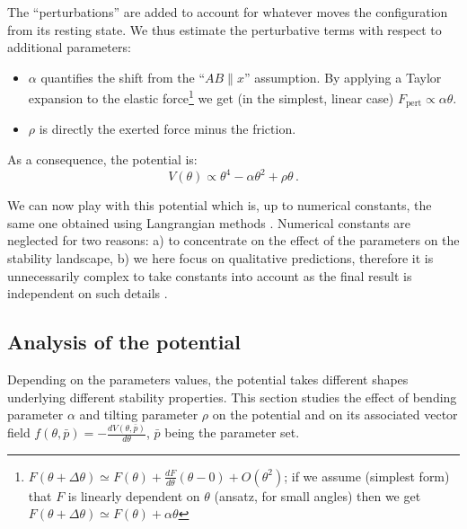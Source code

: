 The ``perturbations'' are added to account for whatever moves the configuration from its resting state. We thus estimate the perturbative terms with respect to additional parameters:
\begin{itemize}
	\item $\alpha$ quantifies the shift from the ``$AB \parallel x$'' assumption. By applying a Taylor expansion to the elastic force\footnote{$F(\theta + \Delta \theta) \simeq F(\theta) + \frac{dF}{d \theta}(\theta - 0) + O(\theta^2)$; if we assume (simplest form) that $F$ is linearly dependent on $\theta$ (ansatz, for small angles) then we get $F(\theta + \Delta \theta) \simeq F(\theta) + \alpha \theta $} we get (in the simplest, linear case) $F_{\text{pert}} \propto \alpha \theta$. 
	\item $\rho$ is directly the exerted force minus the friction.
\end{itemize}

As a consequence, the potential is:
\begin{equation}
	V(\theta) \propto \theta^4 - \alpha \theta^2 + \rho \theta \, .
	\label{eq:cm_potential}
\end{equation}

We can now play with this potential which is, up to numerical constants, the same one obtained using Langrangian methods \citep{poston1979catastrophe}. Numerical constants are neglected for two reasons: a) to concentrate on the effect of the parameters on the stability landscape, b) we here focus on qualitative predictions, therefore it is unnecessarily complex to take constants into account as the final result is independent on such details \citep{Thom2554}. 




\tocless\subsection{Analysis of the potential}
Depending on the parameters values, the potential takes different shapes underlying different stability properties. This section studies the effect of bending parameter $\alpha$ and tilting parameter $\rho$ on the potential and on its associated vector field $f(\theta, \bar{p}) = -\frac{dV(\theta, \bar{p})}{d \theta}$, $\bar{p}$ being the parameter set. \\

